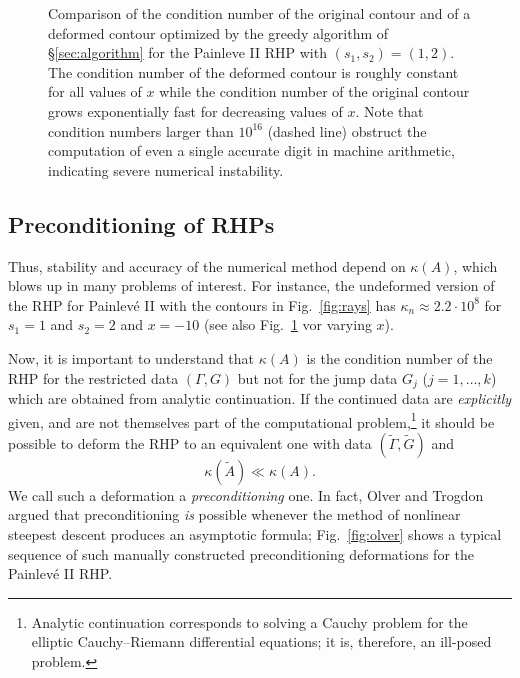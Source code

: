 \documentclass[reqno]{amsart}
\begin{document}
\begin{figure}[tbp]
	\begin{center}
	\end{center}
	\caption{Comparison of the condition number of the original contour and of a deformed contour optimized by the greedy algorithm of 
	§\ref{sec:algorithm} for the Painleve II RHP with $(s_1,s_2) = (1,2)$. The condition number of the deformed contour is roughly constant for all values of $x$ while the condition number of the original contour grows exponentially fast for decreasing values of $x$. Note that condition numbers larger
	than $10^{16}$ (dashed line) obstruct the computation of even a single accurate digit in machine arithmetic, indicating severe numerical instability.}\label{fig:cond}
\end{figure}

\subsection*{Preconditioning of RHPs} Thus, stability and accuracy of the numerical method depend on $\kappa(A)$, which blows
up in many problems of interest. For instance, the undeformed version of the RHP for Painlevé II with the contours in Fig.~\ref{fig:rays} has $\kappa_n \approx 2.2\cdot 10^8$ for $s_1=1$ and $s_2=2$ and $x=-10$ (see also Fig.~\ref{fig:cond} vor varying $x$). 

Now, it is important to understand that $\kappa(A)$ is the condition number of the RHP for the 
restricted data $(\Gamma,G)$ but not for the jump data $G_j$ ($j=1,\ldots,k$) 
which are obtained from analytic continuation. If the 
continued data are \emph{explicitly} given, and are not themselves part of the computational problem,\footnote{Analytic continuation corresponds to solving a Cauchy problem for
the elliptic Cauchy--Riemann differential equations; it is, therefore, an ill-posed problem.} it should be possible
to deform the RHP to an equivalent one with data $(\tilde \Gamma, \tilde G)$ and $$\kappa(\tilde A) \ll \kappa(A).$$
We call such a deformation a {\em preconditioning} one.
In fact, Olver and Trogdon \cite{1205.5604} argued that preconditioning \emph{is} possible whenever
the method of nonlinear steepest descent produces an asymptotic formula; Fig.~\ref{fig:olver} shows a typical
sequence of such manually constructed preconditioning deformations for the Painlevé II RHP. 
\end{document}
